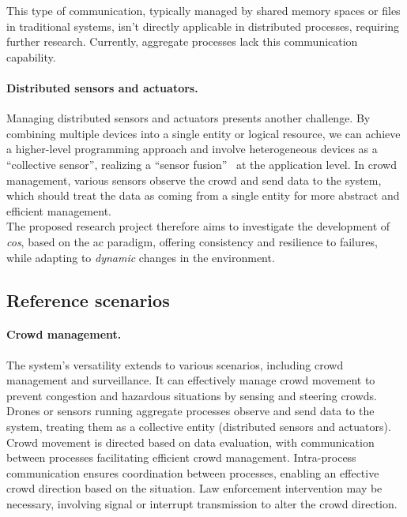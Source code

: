 \documentclass[12pt, a4paper]{article}
\begin{document}
This type of communication,
typically managed by shared memory spaces or files in traditional systems,
isn't directly applicable in distributed processes,
requiring further research.
%
Currently, aggregate processes lack this communication capability.

\paragraph{Distributed sensors and actuators.}
\label{par:distributed-sensors-and-actuators}
Managing distributed sensors and actuators presents another challenge.
%
By combining multiple devices into a single entity or logical resource,
we can achieve a higher-level programming approach and involve heterogeneous devices as a ``collective sensor'',
realizing a ``sensor fusion''~\cite{DBLP:journals/arc/Sasiadek02} at the application level.
%
In crowd management,
various sensors observe the crowd and send data to the system,
which should treat the data as coming from a single entity for more abstract and efficient management.
\\

The proposed research project therefore aims to investigate the development of \emph{\ac{cos}},
based on the \ac{ac} paradigm,
offering consistency and resilience to failures,
while adapting to \emph{dynamic} changes in the environment.

\subsection{Reference scenarios}
\label{subsec:example-applications}

\sloppypar
\paragraph{Crowd management.}

The system's versatility extends to various scenarios,
including crowd management and surveillance.
%
It can effectively manage crowd movement to prevent congestion and hazardous situations by sensing and steering crowds.
%
Drones or sensors running aggregate processes observe and send data to the system,
treating them as a collective entity (distributed sensors and actuators).
%
Crowd movement is directed based on data evaluation,
with communication between processes facilitating efficient crowd management.
%
Intra-process communication ensures coordination between processes, enabling an effective crowd direction based on the situation.
%
Law enforcement intervention may be necessary,
involving signal or interrupt transmission to alter the crowd direction.
\end{document}
